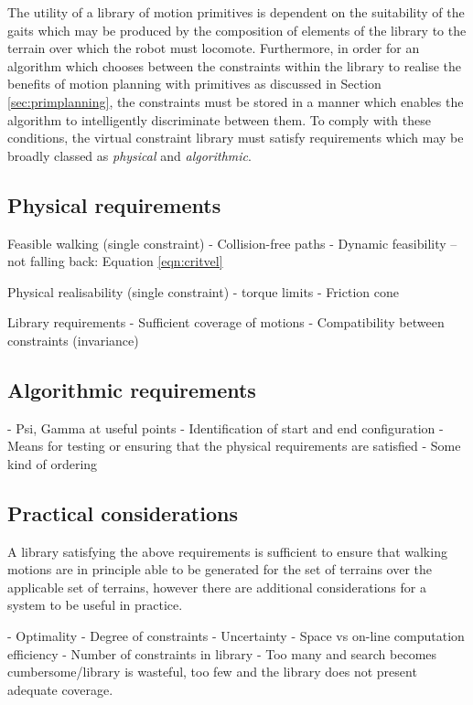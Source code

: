 The utility of a library of motion primitives is dependent on the suitability of the gaits which may be produced by the composition of elements of the library to the terrain over which the robot must locomote. Furthermore, in order for an algorithm which chooses between the constraints within the library to realise the benefits of motion planning with primitives as discussed in Section \ref{sec:primplanning}, the constraints must be stored in a manner which enables the algorithm to intelligently discriminate between them. To comply with these conditions, the virtual constraint library must satisfy requirements which may be broadly classed as \textit{physical} and \textit{algorithmic}.

\subsection{Physical requirements}
Feasible walking (single constraint)
- Collision-free paths
- Dynamic feasibility -- not falling back: Equation \ref{eqn:critvel}

Physical realisability (single constraint)
- torque limits
- Friction cone

Library requirements
- Sufficient coverage of motions
- Compatibility between constraints (invariance)

\subsection{Algorithmic requirements}
- Psi, Gamma at useful points
- Identification of start and end configuration
- Means for testing or ensuring that the physical requirements are satisfied
- Some kind of ordering

\subsection{Practical considerations}
A library satisfying the above requirements is sufficient to ensure that walking motions are in principle able to be generated for the set of terrains over the applicable set of terrains, however there are additional considerations for a system to be useful in practice.

- Optimality
- Degree of constraints
- Uncertainty
- Space vs on-line computation efficiency
- Number of constraints in library - Too many and search becomes cumbersome/library is wasteful, too few and the library does not present adequate coverage.